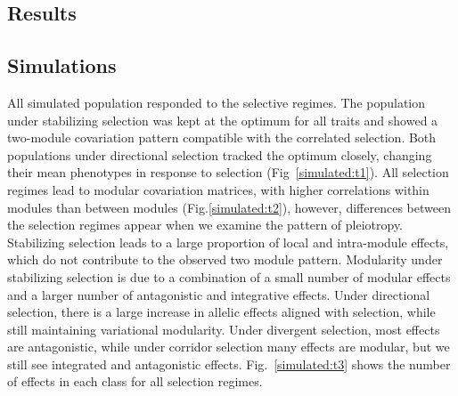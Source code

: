 \begin{refsection}
\section{Results}

\subsection{Simulations}


All simulated population responded to the selective regimes. The population
under stabilizing selection was kept at the optimum for all traits and showed
a two-module covariation pattern compatible with the correlated selection.
Both populations under directional selection tracked the optimum closely,
changing their mean phenotypes in response to selection
(Fig~\ref{simulated:t1}). All selection regimes lead to modular covariation
matrices, with higher correlations within modules than between modules
(Fig.\ref{simulated:t2}), however, differences between the selection regimes
appear when we examine the pattern of pleiotropy. Stabilizing selection leads
to a large proportion of local and intra-module effects, which do not
contribute to the observed two module pattern. Modularity under stabilizing
selection is due to a combination of a small number of modular effects and a
larger number of antagonistic and integrative effects. Under directional
selection, there is a large increase in allelic effects aligned with
selection, while still maintaining variational modularity. Under divergent
selection, most effects are antagonistic, while under corridor selection many
effects are modular, but we still see integrated and antagonistic effects.
Fig.~\ref{simulated:t3} shows the number of effects in each class for all
selection regimes. 


\end{refsection}
